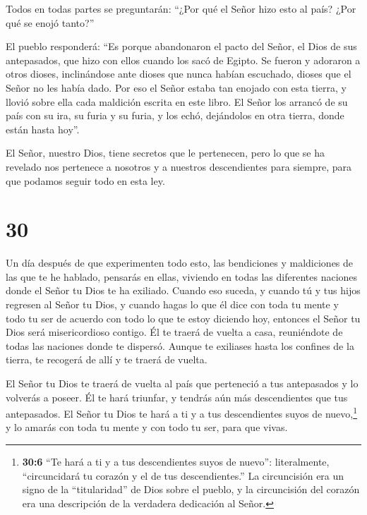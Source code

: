  Todos en todas partes se preguntarán: ``¿Por qué el Señor
hizo esto al país? ¿Por qué se enojó tanto?''

 El pueblo responderá: ``Es porque abandonaron el pacto del
Señor, el Dios de sus antepasados, que hizo con ellos cuando los sacó de
Egipto.  Se fueron y adoraron a otros dioses, inclinándose
ante dioses que nunca habían escuchado, dioses que el Señor no les había
dado.  Por eso el Señor estaba tan enojado con esta tierra,
y llovió sobre ella cada maldición escrita en este libro. 
El Señor los arrancó de su país con su ira, su furia y su furia, y los
echó, dejándolos en otra tierra, donde están hasta hoy''.

 El Señor, nuestro Dios, tiene secretos que le pertenecen,
pero lo que se ha revelado nos pertenece a nosotros y a nuestros
descendientes para siempre, para que podamos seguir todo en esta ley.

\hypertarget{section-29}{%
\section{30}\label{section-29}}

 Un día después de que experimenten todo esto, las
bendiciones y maldiciones de las que te he hablado, pensarás en ellas,
viviendo en todas las diferentes naciones donde el Señor tu Dios te ha
exiliado.  Cuando eso suceda, y cuando tú y tus hijos
regresen al Señor tu Dios, y cuando hagas lo que él dice con toda tu
mente y todo tu ser de acuerdo con todo lo que te estoy diciendo hoy,
entonces el Señor tu Dios será misericordioso contigo.  Él
te traerá de vuelta a casa, reuniéndote de todas las naciones donde te
dispersó.  Aunque te exiliases hasta los confines de la
tierra, te recogerá de allí y te traerá de vuelta.

 El Señor tu Dios te traerá de vuelta al país que perteneció
a tus antepasados y lo volverás a poseer. Él te hará triunfar, y tendrás
aún más descendientes que tus antepasados.  El Señor tu Dios
te hará a ti y a tus descendientes suyos de nuevo,\footnote{\textbf{30:6}
  ``Te hará a ti y a tus descendientes suyos de nuevo'': literalmente,
  ``circuncidará tu corazón y el de tus descendientes.'' La circuncisión
  era un signo de la ``titularidad'' de Dios sobre el pueblo, y la
  circuncisión del corazón era una descripción de la verdadera
  dedicación al Señor.} y lo amarás con toda tu mente y con todo tu ser,
para que vivas.

